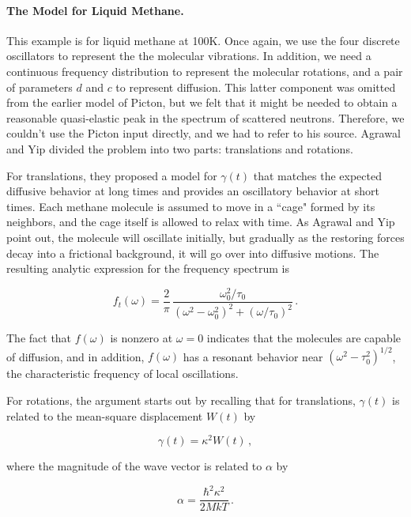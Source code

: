 \paragraph{The Model for Liquid Methane.}
This example is for liquid methane at 100K.  Once again, we use the
four discrete oscillators to represent the the molecular vibrations.
 In addition, we need a continuous frequency distribution to represent
the molecular rotations, and a pair of parameters $d$ and $c$ to
represent diffusion.  This latter component was omitted from the
earlier model of Picton, but we felt that it might be needed to obtain a
reasonable quasi-elastic peak in the spectrum of scattered neutrons.
Therefore, we couldn't use the Picton input directly, and we had to refer
to his source\cite{AYY}.  Agrawal and Yip divided the problem into two
parts: translations and rotations.

For translations, they proposed a model for $\gamma(t)$ that matches the
expected diffusive behavior at long times and provides an oscillatory
behavior at short times.  Each methane molecule is assumed to move in a
``cage" formed by its neighbors, and the cage itself is allowed to
relax with time.  As Agrawal and Yip point out, the molecule will
oscillate initially, but gradually as the restoring forces decay into
a frictional background, it will go over into diffusive motions.  The
resulting analytic expression for the frequency spectrum is

\begin{equation}
   f_t(\omega)=\frac{2}{\pi}\,\frac{\omega_0^2/\tau_0}
      {(\omega^2-\omega_0^2)^2+(\omega/\tau_0)^2}\,.
   \label{liq1}
\end{equation}

\noindent
The fact that $f(\omega)$ is nonzero at $\omega{=}0$ indicates that the
molecules are capable of diffusion, and in addition, $f(\omega)$ has
a resonant behavior near $(\omega^2{-}\tau_0^2)^{1/2}$, the characteristic
frequency of local oscillations.

For rotations, the argument starts out by recalling that for translations,
$\gamma(t)$ is related to the mean-square displacement $W(t)$ by

\begin{equation}
   \gamma(t)=\kappa^2W(t)\,,
\end{equation}

\noindent
where the magnitude of the wave vector is related to $\alpha$ by

\begin{equation}
   \alpha=\frac{\hbar^2\kappa^2}{2MkT}\,.
\end{equation}

